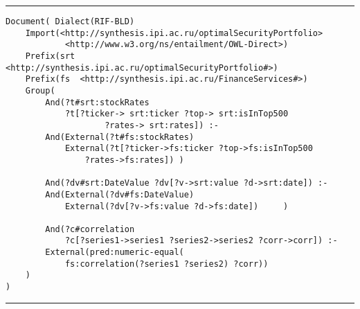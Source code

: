 \hrule

\vspace*{6pt}

{\small
  \begin{verbatim}
Document( Dialect(RIF-BLD)
    Import(<http://synthesis.ipi.ac.ru/optimalSecurityPortfolio>
            <http://www.w3.org/ns/entailment/OWL-Direct>)
    Prefix(srt  <http://synthesis.ipi.ac.ru/optimalSecurityPortfolio#>)
    Prefix(fs  <http://synthesis.ipi.ac.ru/FinanceServices#>)
    Group(
        And(?t#srt:stockRates
            ?t[?ticker-> srt:ticker ?top-> srt:isInTop500
                    ?rates-> srt:rates]) :-
        And(External(?t#fs:stockRates)
            External(?t[?ticker->fs:ticker ?top->fs:isInTop500
                ?rates->fs:rates]) )

        And(?dv#srt:DateValue ?dv[?v->srt:value ?d->srt:date]) :-
        And(External(?dv#fs:DateValue)
            External(?dv[?v->fs:value ?d->fs:date])     )

        And(?c#correlation
            ?c[?series1->series1 ?series2->series2 ?corr->corr]) :-
        External(pred:numeric-equal(
            fs:correlation(?series1 ?series2) ?corr))
    )
)
  \end{verbatim}
}      \hrule

